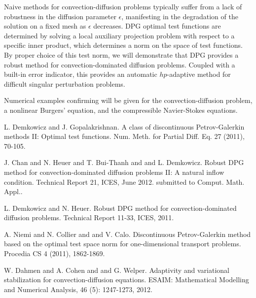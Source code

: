 \documentclass[article,A4,11pt]{llncs}%
\begin{document}
Naive methods for convection-diffusion problems typically suffer from a lack of robustness in the diffusion parameter $\epsilon$, manifesting in the degradation of the solution on a fixed mesh as $\epsilon$ decreases.  DPG optimal test functions are determined by solving a local auxiliary projection problem with respect to a specific inner product, which determines a norm on the space of test functions.  By proper choice of this test norm, we will demonstrate that DPG provides a robust method for convection-dominated diffusion problems.  Coupled with a built-in error indicator, this provides an automatic $hp$-adaptive method for difficult singular perturbation problems.

Numerical examples confirming will be given for the convection-diffusion problem, a nonlinear Burgers' equation, and the compressible Navier-Stokes equations.  


\begin{thebibliography}{10}
{\sc L. Demkowicz and J. Gopalakrishnan}. {A class of discontinuous Petrov-Galerkin methods II: Optimal test functions}. Num. Meth. for Partial Diff. Eq. 27 (2011), 70-105.

{\sc J. Chan and N. Heuer and T. Bui-Thanh and and L. Demkowicz}. {Robust DPG method for convection-dominated diffusion problems II: A natural inflow condition}. Technical Report 21, ICES, June 2012. submitted to Comput. Math. Appl..

{\sc L. Demkowicz and N. Heuer}. {Robust DPG method for convection-dominated diffusion problems}. Technical Report 11-33, ICES, 2011.

{\sc A. Niemi and N. Collier and and V. Calo}. {Discontinuous Petrov-Galerkin method based on the optimal test space norm for one-dimensional transport problems}. Procedia CS 4 (2011), 1862-1869.

{\sc W. Dahmen and A. Cohen and and G. Welper}. {Adaptivity and variational stabilization for convection-diffusion equations}. ESAIM: Mathematical Modelling and Numerical Analysis, 46 (5): 1247-1273, 2012.
\end{thebibliography}
\end{document}
